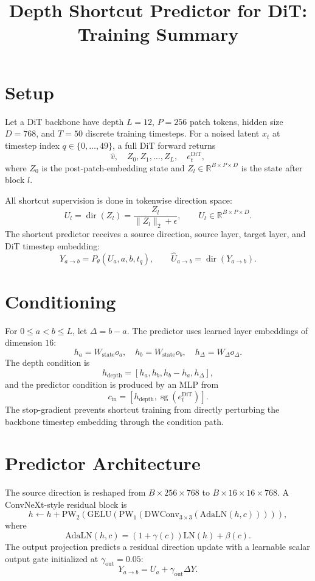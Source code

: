 \documentclass[11pt]{article}
\title{Depth Shortcut Predictor for DiT: Training Summary}
\date{}
\begin{document}
\maketitle

\section{Setup}
Let a DiT backbone have depth $L=12$, $P=256$ patch tokens, hidden size
$D=768$, and $T=50$ discrete training timesteps. For a noised latent
$x_t$ at timestep index $q\in\{0,\ldots,49\}$, a full DiT forward returns
\[
    \hat v,\quad Z_0,Z_1,\ldots,Z_L,\quad e_t^{\mathrm{DiT}},
\]
where $Z_0$ is the post-patch-embedding state and $Z_l\in\mathbb{R}^{B\times P\times D}$
is the state after block $l$.

All shortcut supervision is done in tokenwise direction space:
\[
    U_l=\operatorname{dir}(Z_l)
    =\frac{Z_l}{\|Z_l\|_2+\epsilon},
    \qquad U_l\in\mathbb{R}^{B\times P\times D}.
\]
The shortcut predictor receives a source direction, source layer, target
layer, and DiT timestep embedding:
\[
    Y_{a\rightarrow b}=P_\theta(U_a,a,b,t_q),\qquad
    \hat U_{a\rightarrow b}=\operatorname{dir}(Y_{a\rightarrow b}).
\]

\section{Conditioning}
For $0\leq a<b\leq L$, let $\Delta=b-a$. The predictor uses learned layer
embeddings of dimension $16$:
\[
    h_a=W_{\mathrm{state}}o_a,\quad
    h_b=W_{\mathrm{state}}o_b,\quad
    h_\Delta=W_\Delta o_\Delta .
\]
The depth condition is
\[
    h_{\mathrm{depth}}=[h_a,h_b,h_b-h_a,h_\Delta],
\]
and the predictor condition is produced by an MLP from
\[
    c_{\mathrm{in}}=
    [h_{\mathrm{depth}},\operatorname{sg}(e_t^{\mathrm{DiT}})].
\]
The stop-gradient prevents shortcut training from directly perturbing the
backbone timestep embedding through the condition path.

\section{Predictor Architecture}
The source direction is reshaped from $B\times256\times768$ to
$B\times16\times16\times768$. A ConvNeXt-style residual block is
\[
    h\leftarrow h+
    \mathrm{PW}_2\!\left(
    \mathrm{GELU}\!\left(
    \mathrm{PW}_1\!\left(
    \mathrm{DWConv}_{3\times3}(\mathrm{AdaLN}(h,c))
    \right)\right)\right),
\]
where
\[
    \mathrm{AdaLN}(h,c)=(1+\gamma(c))\mathrm{LN}(h)+\beta(c).
\]
The output projection predicts a residual direction update with a learnable
scalar output gate initialized at $\gamma_{\mathrm{out}}=0.05$:
\[
    Y_{a\rightarrow b}=U_a+\gamma_{\mathrm{out}}\Delta Y.
\]
\end{document}
